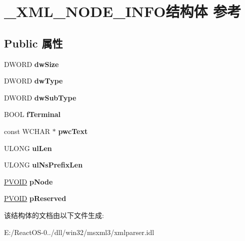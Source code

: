 \hypertarget{struct___x_m_l___n_o_d_e___i_n_f_o}{}\section{\+\_\+\+X\+M\+L\+\_\+\+N\+O\+D\+E\+\_\+\+I\+N\+F\+O结构体 参考}
\label{struct___x_m_l___n_o_d_e___i_n_f_o}
\subsection*{Public 属性}
\begin{DoxyCompactItemize}
\item 
\mbox{\label{struct___x_m_l___n_o_d_e___i_n_f_o_a886afed851c50c4398844bb7f6ea90be}} 
D\+W\+O\+RD {\bfseries dw\+Size}
\item 
\mbox{\label{struct___x_m_l___n_o_d_e___i_n_f_o_aadd37ead575f4a6a4bf87775ae423f5b}} 
D\+W\+O\+RD {\bfseries dw\+Type}
\item 
\mbox{\label{struct___x_m_l___n_o_d_e___i_n_f_o_a93ecb08ae8d2a345c469dc521f5f14cb}} 
D\+W\+O\+RD {\bfseries dw\+Sub\+Type}
\item 
\mbox{\label{struct___x_m_l___n_o_d_e___i_n_f_o_a22d24b2ed0f31e5bc3c8ab25256fc841}} 
B\+O\+OL {\bfseries f\+Terminal}
\item 
\mbox{\label{struct___x_m_l___n_o_d_e___i_n_f_o_af68683b7c70edccf6828975582e00185}} 
const W\+C\+H\+AR $\ast$ {\bfseries pwc\+Text}
\item 
\mbox{\label{struct___x_m_l___n_o_d_e___i_n_f_o_a8bca321894eb7439a1684140f5e2f3f0}} 
U\+L\+O\+NG {\bfseries ul\+Len}
\item 
\mbox{\label{struct___x_m_l___n_o_d_e___i_n_f_o_a0e49d263293b0db80fe7540344e7c35f}} 
U\+L\+O\+NG {\bfseries ul\+Ns\+Prefix\+Len}
\item 
\mbox{\label{struct___x_m_l___n_o_d_e___i_n_f_o_a44d9569cd978950e04f3071ea3401378}} 
\hyperlink{interfacevoid}{P\+V\+O\+ID} {\bfseries p\+Node}
\item 
\mbox{\label{struct___x_m_l___n_o_d_e___i_n_f_o_a8ebcd6d53542dba4ada03b3e5a969150}} 
\hyperlink{interfacevoid}{P\+V\+O\+ID} {\bfseries p\+Reserved}
\end{DoxyCompactItemize}


该结构体的文档由以下文件生成\+:\begin{DoxyCompactItemize}
\item 
E\+:/\+React\+O\+S-\/0../dll/win32/msxml3/xmlparser.\+idl\end{DoxyCompactItemize}
